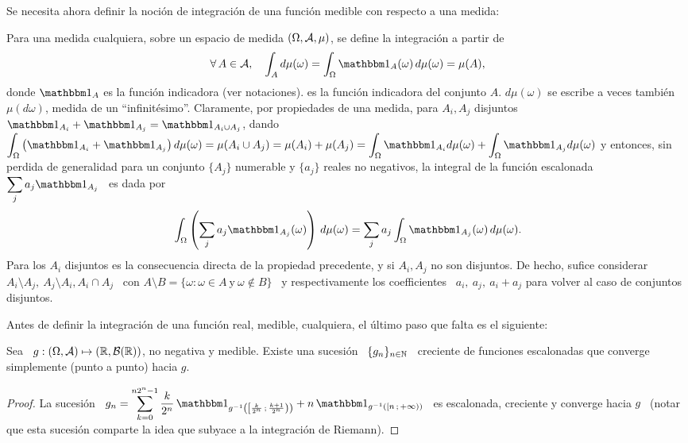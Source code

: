 Se necesita ahora definir la  noci\'on de integraci\'on de una funci\'on medible
con respecto a una medida:
%
\begin{definicion}
\label{Def:MP:MedidaIntegracion}
%
  Para una medida  cualquiera, sobre un espacio de  medida $(\Omega,\mathcal{A},\mu)$, se
  define la integraci\'on a partir de
  \[
  \forall \, A \in \A,  \quad \int_A d\mu(\omega) = \int_\Omega \un_A(\omega) \,
  d\mu(\omega) = \mu(A),
  \]
  donde $\un_A$ es la funci\'on indicadora (ver notaciones).
  es  la funci\'on  indicadora del  conjunto $A$.   $d\mu(\omega)$ se  escribe a
  veces tambi\'en $\mu(d\omega)$,  medida de un ``infinit\'esimo''.  Claramente,
  por  propiedades  de una  medida,  para $  A_i,  A_j$  disjuntos $\un_{A_i}  +
  \un_{A_j}  =  \un_{A_i \cup  A_j}$,  dando  $\displaystyle \int_\Omega  \left(
    \un_{A_i} + \un_{A_j} \right) d\mu(\omega)  = \mu(A_i \cup A_j) = \mu(A_i) +
  \mu(A_j)  =   \int_\Omega  \un_{A_i}  d\mu(\omega)   +  \int_\Omega  \un_{A_j}
  d\mu(\omega)$ y entonces, sin perdida  de generalidad para un conjunto $\{ A_j
  \}$ numerable
  y $\{  a_j \}$ reales no negativos,  la integral de la  funci\'on escalonada \
  $\displaystyle \sum_j a_j \un_{A_j}$ \ es dada por
  \[
  \int_\Omega \left( \sum_j a_j \un_{A_j}(\omega) \right) \, d\mu(\omega) =
  \sum_j a_j \int_\Omega \un_{A_j}(\omega) \, d\mu(\omega).
  \]
  Para  los  $A_i$  disjuntos  es   la  consecuencia  directa  de  la  propiedad
  precedente, y  si $A_i,  A_j$ no son  disjuntos.  De hecho,  sufice considerar
  $A_i\setminus A_j, \:  A_j\setminus A_i, A_i \cap A_j$ \ con  $A \setminus B =
  \{ \omega: \omega \in A \: \mbox{y} \: \omega \not\in B\}$ \ y respectivamente
  los  coefficientes \  $a_i, \:  a_j, \:  a_i  + a_j$  para volver  al caso  de
  conjuntos disjuntos.
\end{definicion}


Antes de definir la integraci\'on de una funci\'on real, medible, cualquiera, el
\'ultimo paso que falta es el siguiente:
%
\begin{teorema}
\label{Teo:MP:MedibleLimite}
%
  Sea   \   $g:   (\Omega,\mathcal{A})   \mapsto  (\mathbb{R},\mathcal{B}(\mathbb{R}))$,   no   negativa   y
  medible. Existe  una sucesi\'on  \ $\{  g_n \}_{n \in  \mathbb{N}}$ \  creciente de
  funciones escalonadas que converge simplemente (punto a punto) hacia $g$.
\end{teorema}
%
\begin{proof}
  La  sucesi\'on \ $\displaystyle  g_n =  \sum_{k=0}^{n 2^n-1}  \frac{k}{2^n} \,
  \un_{g^{-1}\left( \left[ \frac{k}{2^n} \; \frac{k+1}{2^n} \right) \right)} + n
  \, \un_{g^{-1}\left(  \left[ n \;  +\infty \right) \right)}$ \  es escalonada,
  creciente y converge  hacia $g$ \ (notar que esta  sucesi\'on comparte la idea
  que subyace a la integraci\'on de Riemann).
\end{proof}

